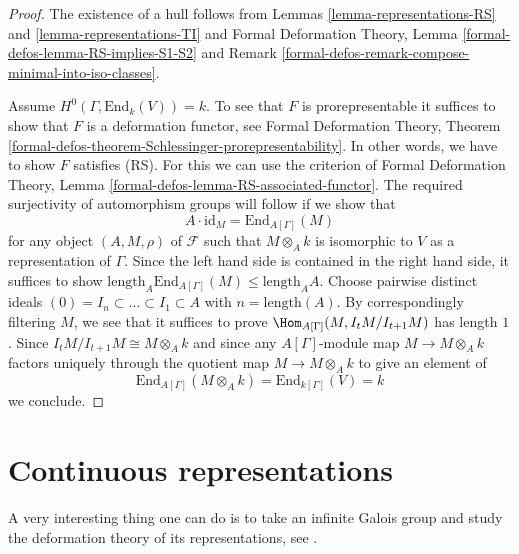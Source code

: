 \begin{proof}
The existence of a hull follows from Lemmas \ref{lemma-representations-RS} and
\ref{lemma-representations-TI} and
Formal Deformation Theory, Lemma \ref{formal-defos-lemma-RS-implies-S1-S2}
and Remark \ref{formal-defos-remark-compose-minimal-into-iso-classes}.

\medskip\noindent
Assume $H^0(\Gamma, \text{End}_k(V)) = k$. To see that $F$
is prorepresentable it suffices to show that $F$ is a
deformation functor, see Formal Deformation Theory, Theorem
\ref{formal-defos-theorem-Schlessinger-prorepresentability}.
In other words, we have to show $F$ satisfies (RS).
For this we can use the criterion of Formal Deformation Theory, Lemma
\ref{formal-defos-lemma-RS-associated-functor}.
The required surjectivity of automorphism groups will follow if we
show that
$$
A \cdot \text{id}_M =
\text{End}_{A[\Gamma]}(M)
$$
for any object $(A, M, \rho)$ of $\mathcal{F}$ such that
$M \otimes_A k$ is isomorphic to $V$ as a representation of $\Gamma$.
Since the left hand side is contained in the right hand side,
it suffices to show
$\text{length}_A \text{End}_{A[\Gamma]}(M) \leq \text{length}_A A$.
Choose pairwise distinct ideals
$(0) = I_n \subset \ldots \subset I_1 \subset A$
with $n = \text{length}(A)$. By correspondingly filtering
$M$, we see that it suffices to prove $\Hom_{A[\Gamma]}(M, I_tM/I_{t + 1}M)$
has length $1$. Since $I_tM/I_{t + 1}M \cong M \otimes_A k$
and since any $A[\Gamma]$-module map $M \to M \otimes_A k$ factors
uniquely through the quotient map $M \to M \otimes_A k$
to give an element of
$$
\text{End}_{A[\Gamma]}(M \otimes_A k) = \text{End}_{k[\Gamma]}(V) = k
$$
we conclude.
\end{proof}



\section{Continuous representations}
\label{section-continuous-representations}

\noindent
A very interesting thing one can do is to take an infinite Galois
group and study the deformation theory of its representations, see
\cite{Mazur-deforming}.

